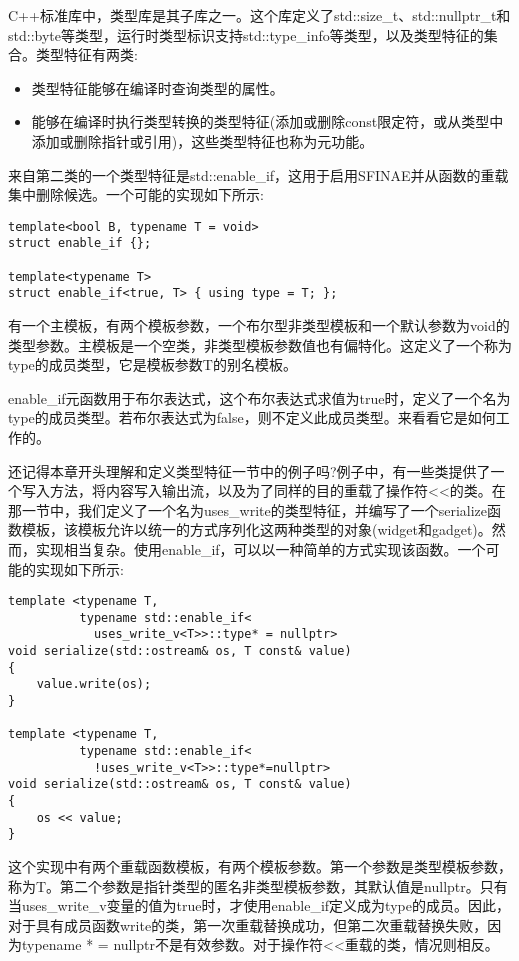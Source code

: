 C++标准库中，类型库是其子库之一。这个库定义了std::size\_t、std::nullptr\_t和std::byte等类型，运行时类型标识支持std::type\_info等类型，以及类型特征的集合。类型特征有两类:

\begin{itemize}
\item
类型特征能够在编译时查询类型的属性。

\item
能够在编译时执行类型转换的类型特征(添加或删除const限定符，或从类型中添加或删除指针或引用)，这些类型特征也称为元功能。
\end{itemize}

来自第二类的一个类型特征是std::enable\_if，这用于启用SFINAE并从函数的重载集中删除候选。一个可能的实现如下所示:

\begin{lstlisting}[style=styleCXX]
template<bool B, typename T = void>
struct enable_if {};

template<typename T>
struct enable_if<true, T> { using type = T; };
\end{lstlisting}

有一个主模板，有两个模板参数，一个布尔型非类型模板和一个默认参数为void的类型参数。主模板是一个空类，非类型模板参数值也有偏特化。这定义了一个称为type的成员类型，它是模板参数T的别名模板。

enable\_if元函数用于布尔表达式，这个布尔表达式求值为true时，定义了一个名为type的成员类型。若布尔表达式为false，则不定义此成员类型。来看看它是如何工作的。

还记得本章开头理解和定义类型特征一节中的例子吗?例子中，有一些类提供了一个写入方法，将内容写入输出流，以及为了同样的目的重载了操作符<{}<的类。在那一节中，我们定义了一个名为uses\_write的类型特征，并编写了一个serialize函数模板，该模板允许以统一的方式序列化这两种类型的对象(widget和gadget)。然而，实现相当复杂。使用enable\_if，可以以一种简单的方式实现该函数。一个可能的实现如下所示:

\begin{lstlisting}[style=styleCXX]
template <typename T,
		  typename std::enable_if<
			uses_write_v<T>>::type* = nullptr>
void serialize(std::ostream& os, T const& value)
{
	value.write(os);
}

template <typename T,
		  typename std::enable_if<
			!uses_write_v<T>>::type*=nullptr>
void serialize(std::ostream& os, T const& value)
{
	os << value;
}
\end{lstlisting}

这个实现中有两个重载函数模板，有两个模板参数。第一个参数是类型模板参数，称为T。第二个参数是指针类型的匿名非类型模板参数，其默认值是nullptr。只有当uses\_write\_v变量的值为true时，才使用enable\_if定义成为type的成员。因此，对于具有成员函数write的类，第一次重载替换成功，但第二次重载替换失败，因为typename * = nullptr不是有效参数。对于操作符<{}<重载的类，情况则相反。

